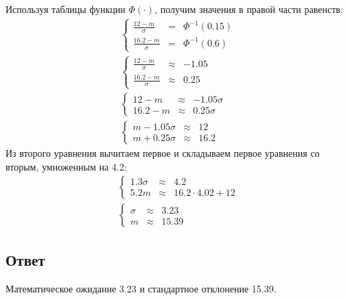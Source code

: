 Используя таблицы функции $\Phi(\cdot)$, получим значения в правой части равенств:
\begin{gather}
    \left \{
    \begin{array}{lcl}
        \frac{12-m}{\sigma}   & = & \Phi^{-1} \left (  0.15 \right ) \\
        \frac{16.2-m}{\sigma} & = & \Phi^{-1} \left ( 0.6 \right )
    \end{array}
    \right . \\
    \left \{
    \begin{array}{lcl}
        \frac{12-m}{\sigma}   & \approx & -1.05 \\
        \frac{16.2-m}{\sigma} & \approx & 0.25
    \end{array}
    \right . \\
    \left \{
    \begin{array}{lcl}
        12 - m   & \approx & -1.05 \sigma \\
        16.2 - m & \approx & 0.25 \sigma
    \end{array}
    \right . \\
    \left \{
    \begin{array}{lcl}
        m - 1.05 \sigma & \approx & 12   \\
        m + 0.25 \sigma & \approx & 16.2
    \end{array}
    \right .
\end{gather}
Из второго уравнения вычитаем первое и складываем первое уравнения со вторым, умноженным на 4.2:
\begin{gather}
    \left \{
    \begin{array}{lcl}
        1.3 \sigma & \approx & 4.2                  \\
        5.2 m      & \approx & 16.2 \cdot 4.02 + 12
    \end{array}
    \right . \\
    \left \{
    \begin{array}{lcl}
        \sigma & \approx & 3.23  \\
        m      & \approx & 15.39
    \end{array}
    \right .
\end{gather}

\subsection*{Ответ}
Математическое ожидание 3.23 и стандартное отклонение 15.39.
